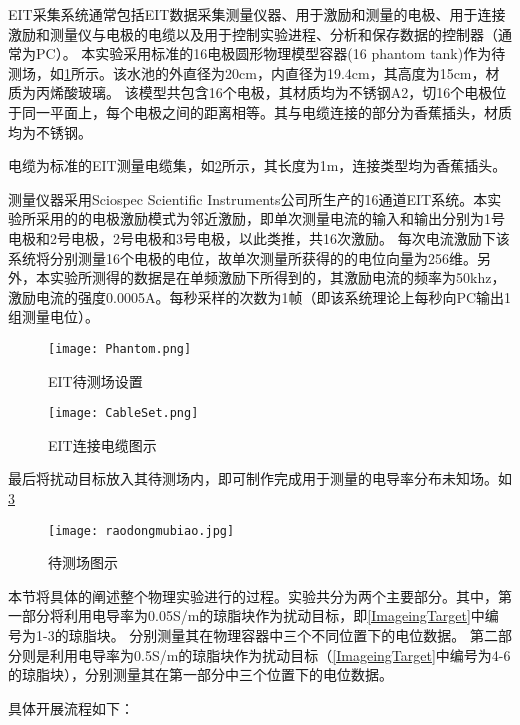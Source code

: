 EIT采集系统通常包括EIT数据采集测量仪器、用于激励和测量的电极、用于连接激励和测量仪与电极的电缆以及用于控制实验进程、分析和保存数据的控制器（通常为PC）。
本实验采用标准的16电极圆形物理模型容器(16 phantom tank)作为待测场，如\cref{figure:Phantom}所示。该水池的外直径为20cm，内直径为19.4cm，其高度为15cm，材质为丙烯酸玻璃。
该模型共包含16个电极，其材质均为不锈钢A2，切16个电极位于同一平面上，每个电极之间的距离相等。其与电缆连接的部分为香蕉插头，材质均为不锈钢。

电缆为标准的EIT测量电缆集，如\cref{figure:CableSet}所示，其长度为1m，连接类型均为香蕉插头。

测量仪器采用Sciospec Scientific Instruments公司所生产的16通道EIT系统。本实验所采用的的电极激励模式为邻近激励，即单次测量电流的输入和输出分别为1号电极和2号电极，2号电极和3号电极，以此类推，共16次激励。
每次电流激励下该系统将分别测量16个电极的电位，故单次测量所获得的的电位向量为256维。另外，本实验所测得的数据是在单频激励下所得到的，其激励电流的频率为50khz，
激励电流的强度0.0005A。每秒采样的次数为1帧（即该系统理论上每秒向PC输出1组测量电位）。

\begin{figure}
    \centering
    \texttt{[image: Phantom.png]}
    \caption{EIT待测场设置}
    \label{figure:Phantom}
\end{figure}

\begin{figure}
    \centering
    \texttt{[image: CableSet.png]}
    \caption{EIT连接电缆图示}
    \label{figure:CableSet}
\end{figure}

最后将扰动目标放入其待测场内，即可制作完成用于测量的电导率分布未知场。如\cref{figure:raodongmubiao}
\begin{figure}[h]
    \centering
    \texttt{[image: raodongmubiao.jpg]}
    \caption{待测场图示}
    \label{figure:raodongmubiao}
\end{figure}


本节将具体的阐述整个物理实验进行的过程。实验共分为两个主要部分。其中，第一部分将利用电导率为0.05S/m的琼脂块作为扰动目标，即\cref{ImageingTarget}中编号为1-3的琼脂块。
分别测量其在物理容器中三个不同位置下的电位数据。
第二部分则是利用电导率为0.5S/m的琼脂块作为扰动目标（\cref{ImageingTarget}中编号为4-6的琼脂块），分别测量其在第一部分中三个位置下的电位数据。

具体开展流程如下：

